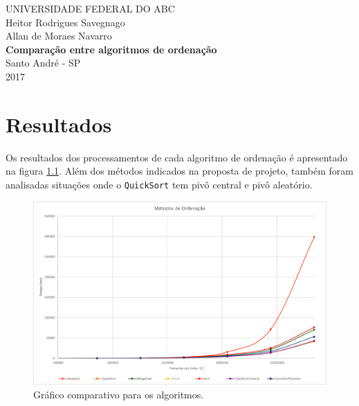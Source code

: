 \documentclass[12pt,twoside]{report}
\newcommand{\autor}{Heitor Rodrigues Savegnago\\Allan de Moraes Navarro}
\newcommand{\titulo}{Comparação entre algoritmos de ordenação}
\newcommand{\local}{Santo André - SP}
\newcommand{\data}{2017}
\newcommand{\notaDeRosto}
{
	\hspace{.45\textwidth} %
    \begin{minipage}{.5\textwidth}
      \singlespace
      Palavras
    \end{minipage}
}
\begin{document}
	\begin{titlepage}
      \center
      {\large UNIVERSIDADE FEDERAL DO ABC}\\[4cm]
      {\large \autor}\\[4cm]
      {\Large \bf \titulo }\\\vfill
      {\local\\\data}
	\end{titlepage}
       
    \pagestyle{empty}
	    
	\chapter{Resultados}
	
	Os resultados dos processamentos de cada algoritmo de ordenação é apresentado na figura \ref{Graph}. Além dos métodos indicados na proposta de projeto, também foram analisadas situações onde o \lstinline|QuickSort| tem pivô central e pivô aleatório.
	
	\begin{figure}[!h]
		\begin{center}
			\includegraphics[width=\textwidth]{../Grafico.png}
			\caption{Gráfico comparativo para os algoritmos.}
			\label {Graph}
		\end{center}
	\end{figure}
	
\end{document}
